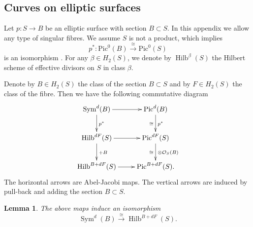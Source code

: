 \documentclass{amsart}
\newtheorem{lemma}[theorem]{Lemma}
\theoremstyle{definition}
\newtheorem{remark}[theorem]{Remark}
\renewcommand{\O}{\mathcal{O}}
\newcommand{\Pic}{\mathrm{Pic}}
\newcommand{\Sym}{\operatorname{Sym}}
\newcommand{\Hilb}{\operatorname{Hilb}}
\begin{document}
\subsection{Curves on elliptic surfaces}\label{appHilb}

Let $p : S \rightarrow B$ be an elliptic surface with section $B \subset S$. In this appendix we allow any type of singular fibres. We assume $S$ is not a product, which implies
$$
p^* : \Pic^0(B) \stackrel{\cong}{\longrightarrow} \Pic^0(S)
$$
is an isomorphism \cite[VII.1.1]{Mir}. For any $\beta \in H_2(S)$, we denote by $\Hilb^\beta(S)$ the Hilbert scheme of effective divisors on $S$ in class $\beta$. 

Denote by $B \in H_2(S)$ the class of the section $B \subset S$ and by $F \in H_2(S)$ the class of the fibre. Then we have the following commutative diagram 
\begin{displaymath}
\xymatrix
{
\Sym^d(B) \ar[d]^{p^*} \ar[r] & \Pic^d(B) \ar[d]^{p^*}_{\cong} \\
\Hilb^{dF}(S) \ar[d]^{+B} \ar[r] & \Pic^{dF}(S) \ar[d]^{\otimes \O_S(B)}_{\cong} \\
\Hilb^{B+dF}(S) \ar[r] & \Pic^{B+dF}(S). 
}
\end{displaymath}
The horizontal arrows are Abel-Jacobi maps. The vertical arrows are induced by pull-back and adding the section $B \subset S$. 
\begin{lemma} \label{Hilbcvs}
The above maps induce an isomorphism
$$
\Sym^d(B) \stackrel{\cong}{\longrightarrow} \Hilb^{B+dF}(S).
$$
\end{lemma}

\end{document}
